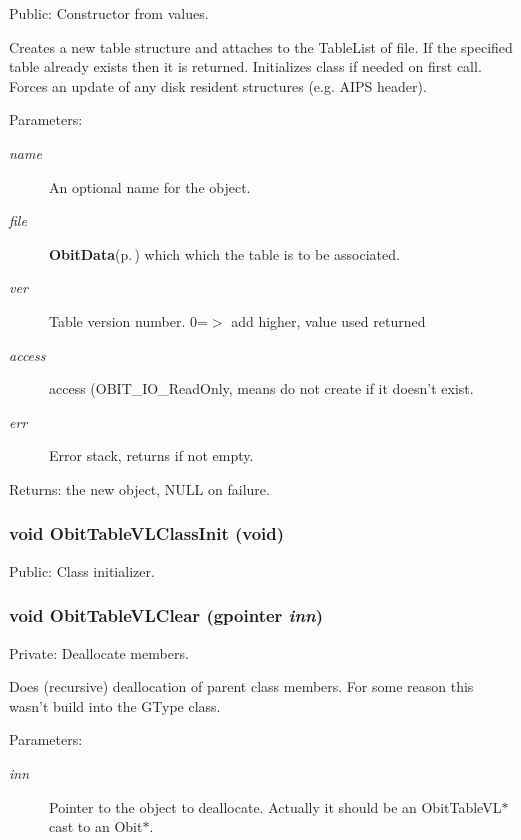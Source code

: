 Public: Constructor from values. 

Creates a new table structure and attaches to the Table\-List of file. If the specified table already exists then it is returned. Initializes class if needed on first call. Forces an update of any disk resident structures (e.g. AIPS header). \begin{Desc}
\item[Parameters:]
\begin{description}
\item[{\em name}]An optional name for the object. \item[{\em file}]{\bf Obit\-Data}{\rm (p.\,\pageref{structObitData})} which which the table is to be associated. \item[{\em ver}]Table version number. 0=$>$ add higher, value used returned \item[{\em access}]access (OBIT\_\-IO\_\-Read\-Only, means do not create if it doesn't exist. \item[{\em err}]Error stack, returns if not empty. \end{description}
\end{Desc}
\begin{Desc}
\item[Returns:]the new object, NULL on failure. \end{Desc}
\subsubsection{\setlength{\rightskip}{0pt plus 5cm}void Obit\-Table\-VLClass\-Init (void)}\label{ObitTableVL_8c_a27}


Public: Class initializer. 

\subsubsection{\setlength{\rightskip}{0pt plus 5cm}void Obit\-Table\-VLClear (gpointer {\em inn})}\label{ObitTableVL_8c_a9}


Private: Deallocate members. 

Does (recursive) deallocation of parent class members. For some reason this wasn't build into the GType class. \begin{Desc}
\item[Parameters:]
\begin{description}
\item[{\em inn}]Pointer to the object to deallocate. Actually it should be an Obit\-Table\-VL$\ast$ cast to an Obit$\ast$. \end{description}
\end{Desc}
